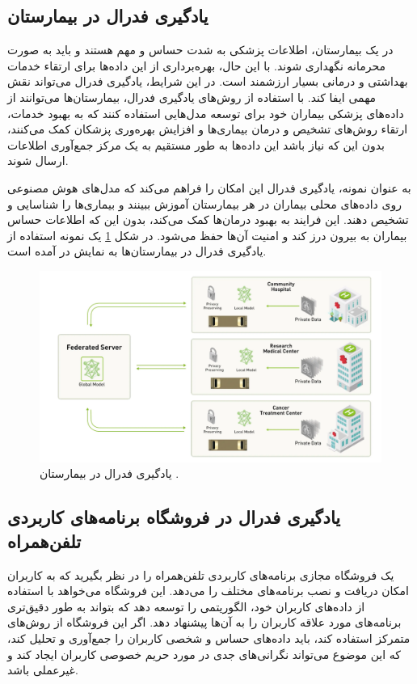 \subsection{یادگیری فدرال در بیمارستان}
در یک بیمارستان، اطلاعات پزشکی به شدت حساس و مهم هستند و باید به صورت محرمانه نگهداری شوند. با این حال، بهره‌برداری از این داده‌ها برای ارتقاء خدمات بهداشتی و درمانی بسیار ارزشمند است. در این شرایط، یادگیری فدرال می‌تواند نقش مهمی ایفا کند. با استفاده از روش‌های یادگیری فدرال، بیمارستان‌ها می‌توانند از داده‌های پزشکی بیماران خود برای توسعه مدل‌هایی استفاده کنند که به بهبود خدمات، ارتقاء روش‌های تشخیص و درمان بیماری‌ها و افزایش بهره‌وری پزشکان کمک می‌کنند، بدون این که نیاز باشد این داده‌ها به طور مستقیم به یک مرکز جمع‌آوری اطلاعات ارسال شوند.

به عنوان نمونه، یادگیری فدرال این امکان را فراهم می‌کند که مدل‌های هوش مصنوعی روی داده‌های محلی بیماران در هر بیمارستان آموزش ببینند و بیماری‌ها را شناسایی و تشخیص دهند. این فرایند به بهبود درمان‌ها کمک می‌کند، بدون این که اطلاعات حساس بیماران به بیرون درز کند و امنیت آن‌ها حفظ می‌شود. در شکل
\ref{hospital}
یک نمونه استفاده از یادگیری فدرال در بیمارستان‌ها به نمایش در آمده است.


\begin{figure}[b!]
	\centering
	\includegraphics[scale=1]{images/chap1/hospital.png}%
	\caption{%
		یادگیری فدرال در بیمارستان
		\cite{rieke2019what}%
		.
	}
	\label{hospital}
	\centering
\end{figure}



\subsection{
	یادگیری فدرال در فروشگاه برنامه‌های کاربردی%
	تلفن‌همراه
}
یک فروشگاه مجازی برنامه‌های کاربردی تلفن‌همراه را در نظر بگیرید که به کاربران امکان دریافت و نصب برنامه‌های مختلف را می‌دهد. این فروشگاه می‌خواهد با استفاده از داده‌های کاربران خود، الگوریتمی را توسعه دهد که بتواند به طور دقیق‌تری برنامه‌های مورد علاقه کاربران را به آن‌ها پیشنهاد دهد. اگر این فروشگاه از روش‌های متمرکز استفاده کند، باید داده‌های حساس و شخصی کاربران را جمع‌آوری و تحلیل کند، که این موضوع می‌تواند نگرانی‌های جدی در مورد حریم خصوصی کاربران ایجاد کند و غیرعملی باشد.

